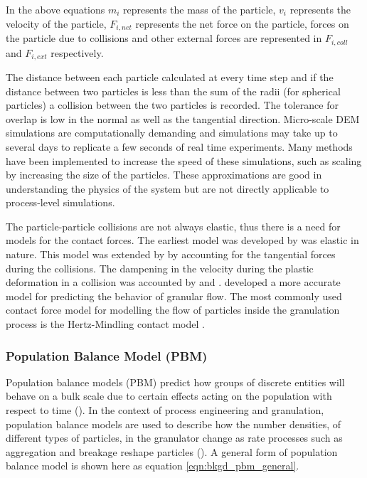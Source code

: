 \documentclass[preprint,11pt,authoryear]{elsarticle}
\begin{document}
In the above equations $m_i$ represents the mass of the particle, $v_i$ represents the velocity of 
the particle, $F_{i,net}$  represents the net force on the particle, forces on the particle due to collisions 
and other external forces are represented in $F_{i,coll}$ and $F_{i,ext}$ respectively.

The distance between each particle calculated at every time step and if the distance between two 
particles is less than the sum of the radii (for spherical particles)  a collision between the two particles 
is recorded. The tolerance for overlap is low in the normal as well as the tangential direction. 
Micro-scale DEM simulations are computationally demanding and simulations may take up to several 
days to replicate a few seconds of real time experiments. Many methods have been implemented to 
increase the speed of these simulations, such as scaling by increasing the size of the particles. These 
approximations are good in understanding the physics of the system but are not directly applicable to 
process-level simulations. 

The particle-particle collisions are not always elastic, thus there is a need for models for the 
contact forces. The earliest model was developed by \cite{hertz1882} was elastic in nature. This model was 
extended by \cite{mindlin1953} by accounting for the  tangential forces during the collisions. The dampening
in the velocity during the plastic deformation in a collision was accounted by \cite{Cundall1979} and 
\cite{walton1986}. \cite{tsuji1992} developed a more accurate model for predicting the behavior of granular flow.
The most commonly used contact force model for modelling the flow of particles inside the granulation process 
is the Hertz-Mindling contact model \citep{gantt2006}\citep{hassanpour2013}. 
 

\subsubsection{Population Balance Model (PBM)}
     Population balance models (PBM) predict how groups of discrete entities will behave on a 
    bulk scale due to certain effects acting on the population with respect to time 
    (\cite{ramkrishna2014}). In the context of process engineering and granulation, population 
    balance models are used to describe how the number densities, of different types of particles, in 
    the granulator change as rate processes such as aggregation and breakage reshape particles 
    (\cite{Barrasso2013}). A general form of population balance model is shown here as equation 
    \ref{eqn:bkgd_pbm_general}.
    
\end{document}
